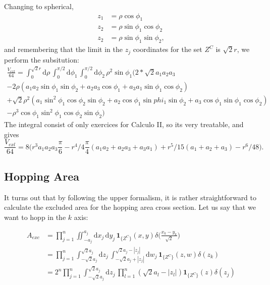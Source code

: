 \documentclass[superscriptaddress,pre,reprint,showpacs,onecolumn]{revtex4-1}
\newcommand{\rd}[1]{\mathrm{d}{#1} \,}
\newcommand{\indicatorsymbol}{\mathbf{1}}
\newcommand{\indicator}[1]{\indicatorsymbol_{ \{   #1 \} } }
\begin{document}
Changing to spherical,
\begin{equation}
  \begin{split}
    z_1 & =\rho \cos \phi_1 \\
    z_2 & =\rho \sin \phi_1 \cos \phi_2 \\
     z_2 & =\rho \sin \phi_1 \sin \phi_2 ,
  \end{split}
\end{equation}
 and remembering that the limit in the
 $z_j$ coordinates for the set  $Z^C$ is $\sqrt{2} r$, we
 perform the subsitution:
  \begin{multline}
  \frac{V_{exl}}{64}= \int_0^{\sqrt{2}r} \rd{\rho}
  \int_0^{\pi/2} \rd{\phi_1}   \int_0^{\pi/2} \rd{\phi_2}
  \rho^2 \sin\phi_1
  \bigg( 2*\sqrt{2} a_1 a_2 a_3 \\
  -2 \rho  ( a_1 a_2 \sin \phi_1 \sin \phi_2
  +a_2 a_3 \cos \phi_1 + a_3 a_1 \sin \phi_1 \cos \phi_2) \\
  +\sqrt{2} \rho^2( a_1 \sin^2\phi_1 \cos\phi_2 \sin\phi_2 
  + a_2 \cos \phi_1 \sin phi_1 \sin\phi_2 
  + a_3 \cos \phi_1 \sin \phi_1 \cos \phi_2 ) \\
  -\rho^3  \cos\phi_1 \sin^2\phi_1 \cos\phi_2 \sin\phi_2 
  \bigg)
   \end{multline}
The integral consist of only exercices for Calculo II, so its very treatable, and gives
\begin{equation}
  \frac{V_{exl}}{64}= 8 \bigg(
   r^3 a_1 a_2 a_3 \frac{\pi}{6}
  - r^4/4 \frac{\pi}{4} (a_1 a_2 +a_2 a_3 + a_3 a_1)
  +  r^5/15 (a_1 + a_2 + a_3)
  -  r^6/48 \bigg).
\end{equation}

\subsection{Hopping Area}

It turns out that by following the upper formalism, it is rather
straightforward to calculate the excluded area for the hopping area
cross section. Let us say that we want to hopp in the $k$ axis:

\begin{equation}
  \begin{split}
    A_{exc} 
   &  =  \prod_{j=1}^n \iint_{-a_j}^{a_j} \rd{x_j} \rd{y_j} \indicator{Z^C} (x,y)
    \delta \big(\frac{x_k-y_k}{\sqrt{2}}\big) \\
    &  =  \prod_{j=1}^n \int_{-\sqrt{2} a_j}^{\sqrt{2}a_j} \rd{z_j}
\int_{-\sqrt{2} a_j+|z_j|}^{\sqrt{2}a_j-|z_j|} \rd{w_j}
 \indicator{Z^C} (z,w)
    \delta (z_k) \\
        &  = 2^n \prod_{j=1}^n \int_{-\sqrt{2} a_j}^{\sqrt{2}a_j} \rd{z_j}
 \prod_{l=1}^n (\sqrt{2}a_l-|z_l|)
 \indicator{Z^C} (z)
    \delta (z_j) 
  \end{split}
\end{equation}
\end{document}
